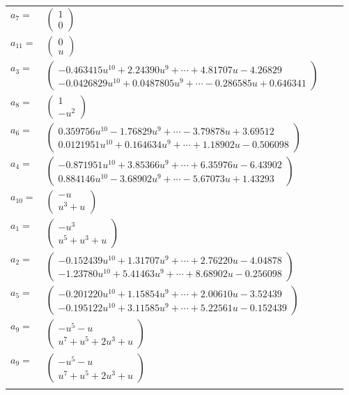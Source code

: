 \documentclass[1p]{elsarticle_modified}
\theoremstyle{definition}
\begin{document}
\begin{tabular}{m{7pt} m{180pt} m{7pt} m{180pt} }
\flushright $a_{7}=$&$\begin{pmatrix}1\\0\end{pmatrix}$ \\
\flushright $a_{11}=$&$\begin{pmatrix}0\\u\end{pmatrix}$ \\
\flushright $a_{3}=$&$\begin{pmatrix}-0.463415 u^{10}+2.24390 u^{9}+\cdots+4.81707 u-4.26829\\-0.0426829 u^{10}+0.0487805 u^{9}+\cdots-0.286585 u+0.646341\end{pmatrix}$ \\
\flushright $a_{8}=$&$\begin{pmatrix}1\\- u^2\end{pmatrix}$ \\
\flushright $a_{6}=$&$\begin{pmatrix}0.359756 u^{10}-1.76829 u^{9}+\cdots-3.79878 u+3.69512\\0.0121951 u^{10}+0.164634 u^{9}+\cdots+1.18902 u-0.506098\end{pmatrix}$ \\
\flushright $a_{4}=$&$\begin{pmatrix}-0.871951 u^{10}+3.85366 u^{9}+\cdots+6.35976 u-6.43902\\0.884146 u^{10}-3.68902 u^{9}+\cdots-5.67073 u+1.43293\end{pmatrix}$ \\
\flushright $a_{10}=$&$\begin{pmatrix}- u\\u^3+u\end{pmatrix}$ \\
\flushright $a_{1}=$&$\begin{pmatrix}- u^3\\u^5+u^3+u\end{pmatrix}$ \\
\flushright $a_{2}=$&$\begin{pmatrix}-0.152439 u^{10}+1.31707 u^{9}+\cdots+2.76220 u-4.04878\\-1.23780 u^{10}+5.41463 u^{9}+\cdots+8.68902 u-0.256098\end{pmatrix}$ \\
\flushright $a_{5}=$&$\begin{pmatrix}-0.201220 u^{10}+1.15854 u^{9}+\cdots+2.00610 u-3.52439\\-0.195122 u^{10}+3.11585 u^{9}+\cdots+5.22561 u-0.152439\end{pmatrix}$ \\
\flushright $a_{9}=$&$\begin{pmatrix}- u^5- u\\u^7+u^5+2 u^3+u\end{pmatrix}$\\ \flushright $a_{9}=$&$\begin{pmatrix}- u^5- u\\u^7+u^5+2 u^3+u\end{pmatrix}$\\&\end{tabular}
\end{document}
